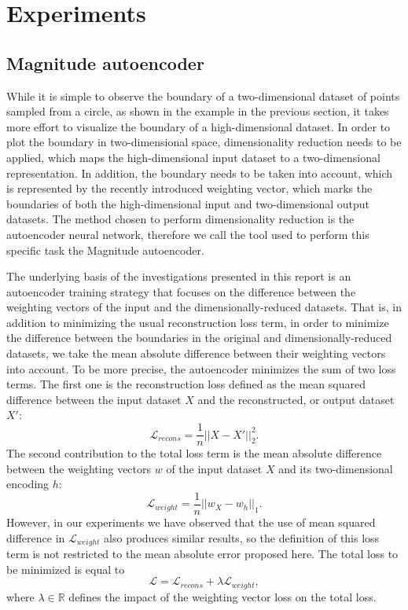 \documentclass{article}
\begin{document}
\section{Experiments}

\subsection{Magnitude autoencoder}

While it is simple to observe the boundary of a two-dimensional dataset of points sampled from a circle, as shown in the example in the previous section, it takes more effort to visualize the boundary of a high-dimensional dataset. In order to plot the boundary in two-dimensional space, dimensionality reduction needs to be applied, which maps the high-dimensional input dataset to a two-dimensional representation. In addition, the boundary needs to be taken into account, which is represented by the  recently introduced weighting vector, which marks the boundaries of both the high-dimensional input and two-dimensional output datasets. The method chosen to perform dimensionality reduction is the autoencoder neural network, therefore we call the tool used to perform this specific task the Magnitude autoencoder.

The underlying basis of the investigations presented in this report is an autoencoder training strategy that focuses on the difference between the weighting vectors of the input and the dimensionally-reduced datasets. That is, in addition to minimizing the usual reconstruction loss term, in order to minimize the difference between the boundaries in the original and dimensionally-reduced datasets, we take the mean absolute difference between their weighting vectors into account. To be more precise, the autoencoder minimizes the sum of two loss terms. The first one is the reconstruction loss defined as the mean squared difference between the input dataset $X$ and the reconstructed, or output dataset $X'$: $$\mathcal{L}_{recons} = \frac{1}{n} ||X - X'||^{2}_{2}.$$ The second contribution to the total loss term is the mean absolute difference between the weighting vectors $w$ of the input dataset $X$ and its two-dimensional encoding $h$: $$\mathcal{L}_{weight} = \frac{1}{n} ||w_{X} - w_{h}||_{1}.$$ However, in our experiments we have observed that the use of mean squared difference in $\mathcal{L}_{weight}$ also produces similar results, so the definition of this loss term is not restricted to the mean absolute error proposed here. The total loss to be minimized is equal to $$\mathcal{L} = \mathcal{L}_{recons} + \lambda \mathcal{L}_{weight},$$ where $\lambda \in \mathbb{R}$ defines the impact of the weighting vector loss on the total loss.
\end{document}
